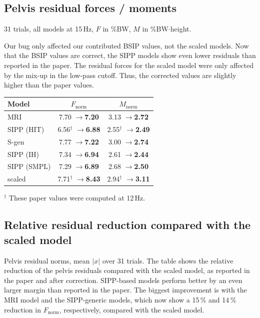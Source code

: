 \documentclass[10pt,a4paper]{article}
\newcommand{\new}[1]{\textbf{#1}}
\newcommand{\arr}{$\rightarrow$}
\begin{document}
\subsection*{Pelvis residual forces / moments}
31 trials, all models at 15\,Hz, $F$ in \%BW, $M$ in \%BW$\cdot$height.

Our bug only affected our contributed BSIP values, not the scaled models. Now that the BSIP values are correct, the SIPP models show even lower residuals than reported in the paper. The residual forces for the scaled model were only affected by the mix-up in the low-pass cutoff. Thus, the corrected values are slightly higher than the paper values.

\begin{center}
\begin{tabular}{lcc}
\toprule
Model & $F_{\mathrm{norm}}$ & $M_{\mathrm{norm}}$ \\
\midrule
MRI         & 7.70 \arr \new{7.20} & 3.13 \arr \new{2.72} \\
SIPP (HIT)  & 6.56$^\dagger$ \arr \new{6.88} & 2.55$^\dagger$ \arr \new{2.49} \\
S-gen       & 7.77 \arr \new{7.22} & 3.00 \arr \new{2.74} \\
SIPP (IH)   & 7.34 \arr \new{6.94} & 2.61 \arr \new{2.44} \\
SIPP (SMPL) & 7.29 \arr \new{6.89} & 2.68 \arr \new{2.50} \\
scaled      & 7.71$^\dagger$ \arr \new{8.43} & 2.94$^\dagger$ \arr \new{3.11} \\
\bottomrule
\end{tabular}
\end{center}
{\footnotesize $^\dagger$ These paper values were computed at 12\,Hz.}

\subsection*{Relative residual reduction compared with the scaled model}
Pelvis residual norms, mean $|x|$ over 31 trials. The table shows the relative reduction of the pelvis residuals compared with the scaled model, as reported in the paper and after correction. SIPP-based models perform better by an even larger margin than reported in the paper. The biggest improvement is with the MRI model and the SIPP-generic models, which now show a 15\,\% and 14\,\% reduction in $F_{\mathrm{norm}}$, respectively, compared with the scaled model.
\end{document}
